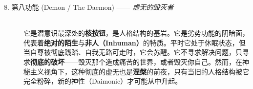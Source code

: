 \documentclass[UTF8,letter,10pt]{ctexart}
\begin{document}
\begin{table}[h!]
\begin{description}
    \item[8. 第八功能 (Demon / The Daemon) —— \textit{虚无的毁灭者}] \hfill \\
    它是潜意识最深处的\textbf{核按钮}，是人格结构的基岩。它是劣势功能的阴暗面，代表着\textbf{绝对的陌生}与\textbf{非人（Inhuman）}的特质。平时它处于休眠状态，但当自尊被彻底践踏、自我无路可走时，它会苏醒。它不寻求解决问题，只寻求\textbf{彻底的破坏}——毁灭那个造成痛苦的世界，或者毁灭你自己。然而，在神秘主义视角下，这种彻底的虚无也是\textbf{涅槃}的前夜，只有当旧的人格结构被它完全粉碎，新的神性（Daimonic）才可能从中升起。

\end{description}
\end{table}

















\end{document}
